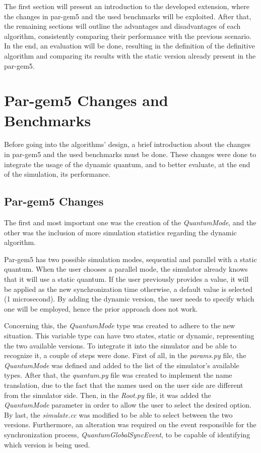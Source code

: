 The first section will present an introduction to the developed extension, where the changes in par-gem5 and the used benchmarks will be exploited.
After that, the remaining sections will outline the advantages and disadvantages of each algorithm, consistently comparing their performance with the 
previous scenario. In the end, an evaluation will be done, resulting in the definition of the definitive algorithm and comparing its results with 
the static version already present in the par-gem5.


\section{Par-gem5 Changes and Benchmarks}


Before going into the algorithms' design, a brief introduction about the changes in par-gem5 and the used benchmarks must be done. These changes 
were done to integrate the usage of the dynamic quantum, and to better evaluate, at the end of the simulation, its performance. 

\subsection{Par-gem5 Changes}

The first and most important one was the creation of the \textit{QuantumMode}, and the other was the inclusion of more simulation 
statistics regarding the dynamic algorithm. 

Par-gem5 has two possible simulation modes, sequential and parallel with a static quantum. When the user chooses a parallel mode, 
the simulator already knows that it will use a static quantum. If the user previously provides a value, it will be applied as the new 
synchronization time otherwise, a default value is selected (1 microsecond). By adding the dynamic version, the user needs to specify which one
will be employed, hence the prior approach does not work.

Concerning this, the \textit{QuantumMode} type was created to adhere to the new situation. This variable type can have two states, static or 
dynamic, representing the two available versions. To integrate it into the simulator and be able to recognize it, a couple of steps were done. 
First of all, in the \textit{params.py} file, the \textit{QuantumMode} was defined and added to the list of the simulator's available types. After 
that, the \textit{quantum.py} file was created to implement the name translation, due to the fact that the names used on the user side are 
different from the simulator side. Then, in the \textit{Root.py} file, it was added the \textit{QuantumMode} parameter in order to allow the user 
to select the desired option. By last, the \textit{simulate.cc} was modified to be able to select between the two versions. Furthermore, an 
alteration was required on the event responsible for the synchronization process, \textit{QuantumGlobalSyncEvent}, to be capable of identifying 
which version is being used. 

